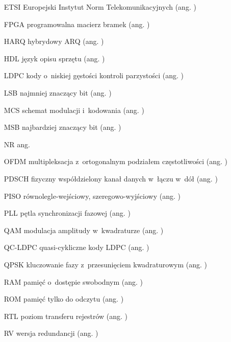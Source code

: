 \begin{itemize}
\item[ETSI] Europejski Instytut Norm Telekomunikacyjnych (ang. )

\item[FPGA] programowalna macierz bramek (ang. )

\item[HARQ] hybrydowy ARQ (ang. )
\item[HDL] język opisu sprzętu (ang. )

\item[LDPC] kody o~niskiej gęstości kontroli parzystości (ang. )
\item[LSB] najmniej znaczący bit (ang. )

\item[MCS] schemat modulacji i~kodowania (ang. )
\item[MSB] najbardziej znaczący bit (ang. )

\item[NR] ang. 

\item[OFDM] multipleksacja z~ortogonalnym podziałem częstotliwości (ang. )

\item[PDSCH] fizyczny współdzielony kanał danych w~łączu w~dół (ang. )
\item[PISO] równolegle-wejściowy, szeregowo-wyjściowy (ang. )
\item[PLL] pętla synchronizacji fazowej (ang. )

\item[QAM] modulacja amplitudy w~kwadraturze (ang. )
\item[QC-LDPC] quasi-cykliczne kody LDPC (ang. )
\item[QPSK] kluczowanie fazy z~przesunięciem kwadraturowym (ang. )

\item[RAM] pamięć o~dostępie swobodnym (ang. )
\item[ROM] pamięć tylko do odczytu (ang. )
\item[RTL] poziom transferu rejestrów (ang. )
\item[RV] wersja redundancji (ang. )


\end{itemize}
